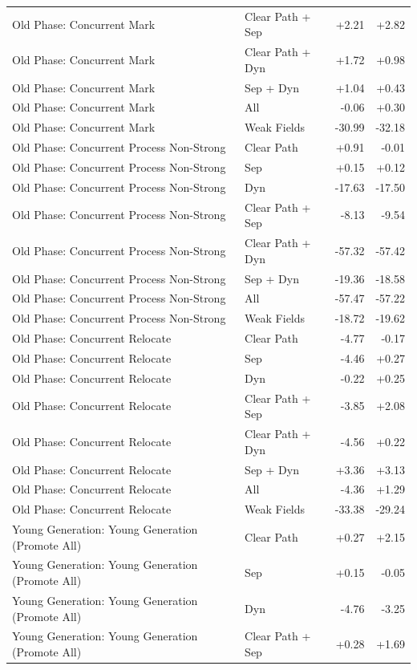 \begin{table}[t]
\begin{tabular}{llrr}
Old Phase: Concurrent Mark & Clear Path + Sep & +2.21 & +2.82 \\
Old Phase: Concurrent Mark & Clear Path + Dyn & +1.72 & +0.98 \\
Old Phase: Concurrent Mark & Sep + Dyn & +1.04 & +0.43 \\
Old Phase: Concurrent Mark & All & -0.06 & +0.30 \\
Old Phase: Concurrent Mark & Weak Fields & -30.99 & -32.18 \\
Old Phase: Concurrent Process Non-Strong & Clear Path & +0.91 & -0.01 \\
Old Phase: Concurrent Process Non-Strong & Sep & +0.15 & +0.12 \\
Old Phase: Concurrent Process Non-Strong & Dyn & -17.63 & -17.50 \\
Old Phase: Concurrent Process Non-Strong & Clear Path + Sep & -8.13 & -9.54 \\
Old Phase: Concurrent Process Non-Strong & Clear Path + Dyn & -57.32 & -57.42 \\
Old Phase: Concurrent Process Non-Strong & Sep + Dyn & -19.36 & -18.58 \\
Old Phase: Concurrent Process Non-Strong & All & -57.47 & -57.22 \\
Old Phase: Concurrent Process Non-Strong & Weak Fields & -18.72 & -19.62 \\
Old Phase: Concurrent Relocate & Clear Path & -4.77 & -0.17 \\
Old Phase: Concurrent Relocate & Sep & -4.46 & +0.27 \\
Old Phase: Concurrent Relocate & Dyn & -0.22 & +0.25 \\
Old Phase: Concurrent Relocate & Clear Path + Sep & -3.85 & +2.08 \\
Old Phase: Concurrent Relocate & Clear Path + Dyn & -4.56 & +0.22 \\
Old Phase: Concurrent Relocate & Sep + Dyn & +3.36 & +3.13 \\
Old Phase: Concurrent Relocate & All & -4.36 & +1.29 \\
Old Phase: Concurrent Relocate & Weak Fields & -33.38 & -29.24 \\
Young Generation: Young Generation (Promote All) & Clear Path & +0.27 & +2.15 \\
Young Generation: Young Generation (Promote All) & Sep & +0.15 & -0.05 \\
Young Generation: Young Generation (Promote All) & Dyn & -4.76 & -3.25 \\
Young Generation: Young Generation (Promote All) & Clear Path + Sep & +0.28 & +1.69 \\

\end{tabular}
\end{table}
